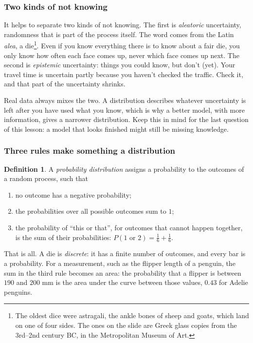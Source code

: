 \documentclass[12pt, a4paper]{article}
\theoremstyle{definition}
\newtheorem{definition}{Definition}[section]
\theoremstyle{remark}
\begin{document}
\subsubsection{Two kinds of not knowing}
It helps to separate two kinds of not knowing. The first is \emph{aleatoric} uncertainty, randomness that is part of the process itself. The word comes from the Latin \textit{alea}, a die\footnote{The oldest dice were astragali, the ankle bones of sheep and goats, which land on one of four sides. The ones on the slide are Greek glass copies from the 3rd--2nd century BC, in the Metropolitan Museum of Art.}. Even if you know everything there is to know about a fair die, you only know how often each face comes up, never which face comes up next. The second is \emph{epistemic} uncertainty: things you could know, but don't (yet). Your travel time is uncertain partly because you haven't checked the traffic. Check it, and that part of the uncertainty shrinks.

Real data always mixes the two. A distribution describes whatever uncertainty is left after you have used what you know, which is why a better model, with more information, gives a narrower distribution. Keep this in mind for the last question of this lesson: a model that looks finished might still be missing knowledge.

\subsubsection{Three rules make something a distribution}
\begin{definition}
\label{def:distribution}
A \emph{probability distribution} assigns a probability to the outcomes of a random process, such that
\begin{enumerate}
\item no outcome has a negative probability;
\item the probabilities over all possible outcomes sum to $1$;
\item the probability of ``this or that'', for outcomes that cannot happen together, is the sum of their probabilities: $P(1 \text{ or } 2) = \tfrac{1}{6} + \tfrac{1}{6}$.
\end{enumerate}
\end{definition}

That is all. A die is \emph{discrete}: it has a finite number of outcomes, and every bar is a probability. For a measurement, such as the flipper length of a penguin, the sum in the third rule becomes an area: the probability that a flipper is between $190$ and $200$ mm is the area under the curve between those values, $0.43$ for Adelie penguins.
\end{document}
